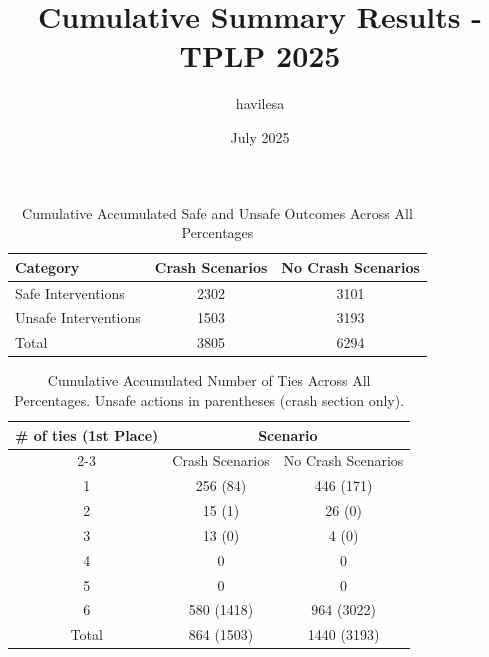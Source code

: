\documentclass{article}
\title{Cumulative Summary Results - TPLP 2025}
\author{havilesa}
\date{July 2025}
\begin{document}
\maketitle

\begin{table}[h]
\centering
\caption{Cumulative Accumulated Safe and Unsafe Outcomes Across All Percentages}
\begin{tabular}{l|cc}
\toprule
Category & Crash Scenarios & No Crash Scenarios \\
\midrule
Safe Interventions & 2302 & 3101 \\ 
Unsafe Interventions & 1503 & 3193 \\ 
\midrule
Total & 3805 & 6294 \\ 
\bottomrule
\end{tabular}
\end{table}

\begin{table}[h]
\centering
\caption{Cumulative Accumulated Number of Ties Across All Percentages.
Unsafe actions in parentheses (crash section only).}
\begin{tabular}{c|cc}
\toprule
\multirow{2}{*}{\# of ties (1st Place)} & \multicolumn{2}{c|}{Scenario} \\
\cmidrule{2-3}
 & Crash Scenarios & No Crash Scenarios \\
\midrule
1 & 256 (84) & 446 (171) \\ 
2 & 15 (1) & 26 (0) \\ 
3 & 13 (0) & 4 (0) \\ 
4 & 0 & 0 \\ 
5 & 0 & 0 \\ 
6 & 580 (1418) & 964 (3022) \\ 
\midrule
Total & 864 (1503) & 1440 (3193) \\ 
\bottomrule
\end{tabular}
\end{table}
\end{document}
